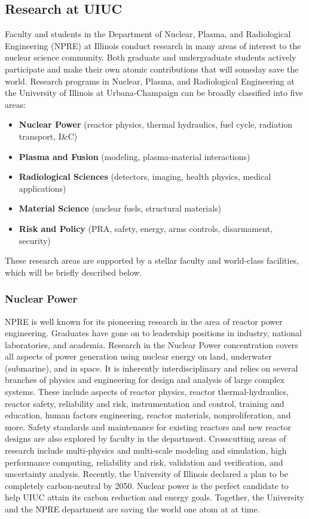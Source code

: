 \subsection{Research at UIUC}
Faculty and students in the Department of Nuclear, Plasma, and Radiological Engineering (NPRE) at Illinois conduct research in many areas of interest to the nuclear science community. Both graduate and undergraduate  students actively participate and make their own atomic contributions that will someday save the world.
Research programs in Nuclear, Plasma, and Radiological Engineering at the University of Illinois at Urbana-Champaign can be
broadly classified into five areas:
\begin{itemize}
        \item \textbf{Nuclear Power} (reactor physics, thermal hydraulics, fuel cycle, radiation transport, I\&C)
        \item \textbf{Plasma and Fusion} (modeling, plasma-material interactions)
        \item \textbf{Radiological Sciences} (detectors, imaging, health physics, medical applications)
        \item \textbf{Material Science} (nuclear fuels, structural materials)
        \item \textbf{Risk and Policy} (PRA, safety, energy, arms controls, disarmament, security)
\end{itemize}

These research areas are supported by a stellar faculty and world-class facilities, which 
will be briefly described below.

\subsubsection{Nuclear Power}
NPRE is well known for its pioneering research in the area of reactor power engineering. Graduates have gone on to leadership positions in industry, national laboratories, and academia. Research in the Nuclear Power concentration covers all aspects of power generation using nuclear energy on land, underwater (submarine), and in space. It is inherently interdisciplinary and relies on several branches of physics and engineering for design and analysis of large complex systems. These include aspects of reactor physics, reactor thermal-hydraulics, reactor safety, reliability and risk, instrumentation and control, training and education, human factors engineering, reactor materials, nonproliferation, and more. Safety standards and maintenance for existing reactors and new reactor designs are also explored by faculty in the department. Crosscutting areas of research include multi-physics and multi-scale modeling and simulation, high performance computing, reliability and risk, validation and verification, and uncertainty analysis. Recently, the University of Illinois declared a plan to be completely carbon-neutral by 2050. Nuclear power is the perfect candidate to help UIUC attain its carbon reduction and energy goals. Together, the University and the NPRE department are saving the world one atom at at time.

